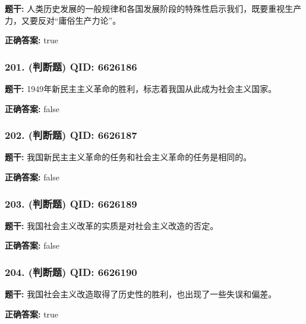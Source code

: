 \documentclass[12pt,UTF8]{ctexart}
\begin{document}
\textbf{题干:}
人类历史发展的一般规律和各国发展阶段的特殊性启示我们，既要重视生产力，又要反对“庸俗生产力论”。

\textbf{正确答案:}
true

\vspace{0.3em}\hrulefill\vspace{0.7em}

\subsubsection*{201. (判断题) \small QID: 6626186}

\textbf{题干:}
1949年新民主主义革命的胜利，标志着我国从此成为社会主义国家。

\textbf{正确答案:}
false

\vspace{0.3em}\hrulefill\vspace{0.7em}

\subsubsection*{202. (判断题) \small QID: 6626187}

\textbf{题干:}
我国新民主主义革命的任务和社会主义革命的任务是相同的。

\textbf{正确答案:}
false

\vspace{0.3em}\hrulefill\vspace{0.7em}

\subsubsection*{203. (判断题) \small QID: 6626189}

\textbf{题干:}
我国社会主义改革的实质是对社会主义改造的否定。

\textbf{正确答案:}
false

\vspace{0.3em}\hrulefill\vspace{0.7em}

\subsubsection*{204. (判断题) \small QID: 6626190}

\textbf{题干:}
我国社会主义改造取得了历史性的胜利，也出现了一些失误和偏差。

\textbf{正确答案:}
true

\vspace{0.3em}\hrulefill\vspace{0.7em}
\end{document}
